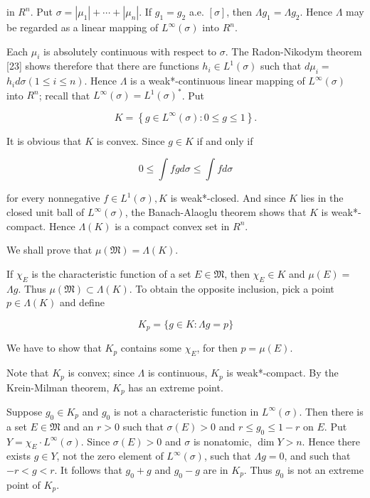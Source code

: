 \documentclass[10pt]{article}
\begin{document}
in $R^{n}$. Put $\sigma=\left|\mu_{1}\right|+\cdots+\left|\mu_{n}\right|$. If $g_{1}=g_{2}$ a.e. $[\sigma]$, then $\Lambda g_{1}=\Lambda g_{2}$. Hence $\Lambda$ may be regarded as a linear mapping of $L^{\infty}(\sigma)$ into $R^{n}$.

Each $\mu_{i}$ is absolutely continuous with respect to $\sigma$. The Radon-Nikodym theorem [23] shows therefore that there are functions $h_{i} \in L^{1}(\sigma)$ such that $d \mu_{i}=$ $h_{i} d \sigma(1 \leq i \leq n)$. Hence $\Lambda$ is a weak*-continuous linear mapping of $L^{\infty}(\sigma)$ into $R^{n}$; recall that $L^{\infty}(\sigma)=L^{1}(\sigma)^{*}$. Put

$$
K=\left\{g \in L^{\infty}(\sigma): 0 \leq g \leq 1\right\} .
$$

It is obvious that $K$ is convex. Since $g \in K$ if and only if

$$
0 \leq \int f g d \sigma \leq \int f d \sigma
$$

for every nonnegative $f \in L^{1}(\sigma), K$ is weak*-closed. And since $K$ lies in the closed unit ball of $L^{\infty}(\sigma)$, the Banach-Alaoglu theorem shows that $K$ is weak*-compact. Hence $\Lambda(K)$ is a compact convex set in $R^{n}$.

We shall prove that $\mu(\mathfrak{M})=\Lambda(K)$.

If $\chi_{E}$ is the characteristic function of a set $E \in \mathfrak{M}$, then $\chi_{E} \in K$ and $\mu(E)=$ $\Lambda g$. Thus $\mu(\mathfrak{M}) \subset \Lambda(K)$. To obtain the opposite inclusion, pick a point $p \in \Lambda(K)$ and define

$$
K_{p}=\{g \in K: \Lambda g=p\}
$$

We have to show that $K_{p}$ contains some $\chi_{E}$, for then $p=\mu(E)$.

Note that $K_{p}$ is convex; since $\Lambda$ is continuous, $K_{p}$ is weak*-compact. By the Krein-Milman theorem, $K_{p}$ has an extreme point.

Suppose $g_{0} \in K_{p}$ and $g_{0}$ is not a characteristic function in $L^{\infty}(\sigma)$. Then there is a set $E \in \mathfrak{M}$ and an $r>0$ such that $\sigma(E)>0$ and $r \leq g_{0} \leq 1-r$ on $E$. Put $Y=\chi_{E} \cdot L^{\infty}(\sigma)$. Since $\sigma(E)>0$ and $\sigma$ is nonatomic, $\operatorname{dim} Y>n$. Hence there exists $g \in Y$, not the zero element of $L^{\infty}(\sigma)$, such that $\Lambda g=0$, and such that $-r<g<r$. It follows that $g_{0}+g$ and $g_{0}-g$ are in $K_{p}$. Thus $g_{0}$ is not an extreme point of $K_{p}$.
\end{document}
